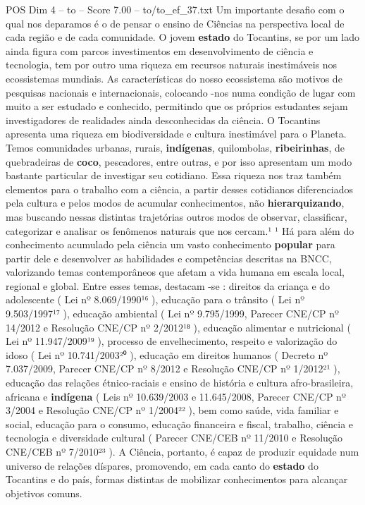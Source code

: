 \begin{textsample}{POS Dim 4 – to – Score 7.00 – to/to\_ef\_37.txt}
Um importante desafio com o qual nos deparamos é o de pensar o ensino de Ciências na perspectiva local de cada região e de cada comunidade.
O jovem \textbf{estado} do Tocantins, se por um lado ainda figura com parcos investimentos em desenvolvimento de ciência e tecnologia, tem por outro uma riqueza em recursos naturais inestimáveis nos ecossistemas mundiais.
As características do nosso ecossistema são motivos de pesquisas nacionais e internacionais, colocando -nos numa condição de lugar com muito a ser estudado e conhecido, permitindo que os próprios estudantes sejam investigadores de realidades ainda desconhecidas da ciência.
O Tocantins apresenta uma riqueza em biodiversidade e cultura inestimável para o Planeta.
Temos comunidades urbanas, rurais, \textbf{indígenas}, quilombolas, \textbf{ribeirinhas}, de quebradeiras de \textbf{coco}, pescadores, entre outras, e por isso apresentam um modo bastante particular de investigar seu cotidiano.
Essa riqueza nos traz também elementos para o trabalho com a ciência, a partir desses cotidianos diferenciados pela cultura e pelos modos de acumular conhecimentos, não \textbf{hierarquizando}, mas buscando nessas distintas trajetórias outros modos de observar, classificar, categorizar e analisar os fenômenos naturais que nos cercam.¹ ¹ Há para além do conhecimento acumulado pela ciência um vasto conhecimento \textbf{popular} para partir dele e desenvolver as habilidades e competências descritas na BNCC, valorizando temas contemporâneos que afetam a vida humana em escala local, regional e global.
Entre esses temas, destacam -se : direitos da criança e do adolescente ( Lei nº 8.069/1990¹⁶ ), educação para o trânsito ( Lei nº 9.503/1997¹⁷ ), educação ambiental ( Lei nº 9.795/1999, Parecer CNE/CP nº 14/2012 e Resolução CNE/CP nº 2/2012¹⁸ ), educação alimentar e nutricional ( Lei nº 11.947/2009¹⁹ ), processo de envelhecimento, respeito e valorização do idoso ( Lei nº 10.741/2003²⁰ ), educação em direitos humanos ( Decreto nº 7.037/2009, Parecer CNE/CP nº 8/2012 e Resolução CNE/CP nº 1/2012²¹ ), educação das relações étnico-raciais e ensino de história e cultura afro-brasileira, africana e \textbf{indígena} ( Leis nº 10.639/2003 e 11.645/2008, Parecer CNE/CP nº 3/2004 e Resolução CNE/CP nº 1/2004²² ), bem como saúde, vida familiar e social, educação para o consumo, educação financeira e fiscal, trabalho, ciência e tecnologia e diversidade cultural ( Parecer CNE/CEB nº 11/2010 e Resolução CNE/CEB nº 7/2010²³ ).
A Ciência, portanto, é capaz de produzir equidade num universo de relações díspares, promovendo, em cada canto do \textbf{estado} do Tocantins e do país, formas distintas de mobilizar conhecimentos para alcançar objetivos comuns.

\end{textsample}
